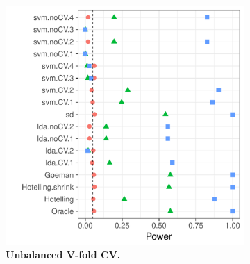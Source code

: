 \documentclass[12pt,a4paper]{article}
\begin{document}
\begin{figure}[h]
	\centering
	\caption{
		The power of the permutation test with various test statistics. 
		The power on the $x$ axis. 
		Effects are color and shape coded. 
		The various statistics on the $y$ axis. 
		Their details are given in Table~\ref{tab:collected}. 
		Effects vary over $\mu=(0,\dots,0)$ (red circle), $\mu=(0.25,\dots,0.25)$ (green triangle), and $\mu=(0.5,\dots,0.5)$ (blue square). 
		Simulation details in Section~\ref{sec:simulation_details}.
		Cross-validation was performed with balanced and unbalanced data folding. See sub-captions.}	
	\label{fig:simulation_1}
	\begin{subfigure}{.5\textwidth}
		\centering
		\includegraphics[width=1\linewidth]{"art/file3"}
		\caption{\textbf{Unbalanced V-fold CV.}} 
		\label{fig:simulation_11}
	\end{subfigure}%
	\begin{subfigure}{.5\textwidth}
		\centering

\end{subfigure}
\end{figure}
\end{document}
